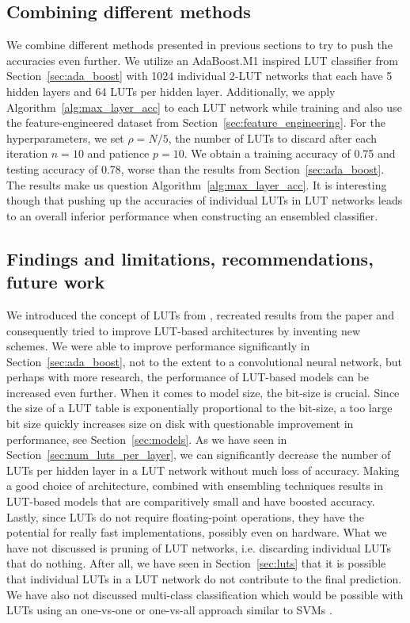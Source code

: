 \subsection{Combining different methods}
We combine different methods presented in previous sections to try to push the accuracies even further. We utilize an AdaBoost.M1 inspired LUT classifier from Section~\ref{sec:ada_boost} with 1024 individual 2-LUT networks that each have 5 hidden layers and 64 LUTs per hidden layer. Additionally, we apply Algorithm~\ref{alg:max_layer_acc} to each LUT network while training and also use the feature-engineered dataset from Section~\ref{sec:feature_engineering}. For the hyperparameters, we set $\rho = N/5$, the number of LUTs to discard after each iteration $n=10$ and patience $p=10$. We obtain a training accuracy of 0.75 and testing accuracy of 0.78, worse than the results from Section~\ref{sec:ada_boost}. The results make us question Algorithm~\ref{alg:max_layer_acc}. It is interesting though that pushing up the accuracies of individual LUTs in LUT networks leads to an overall inferior performance when constructing an ensembled classifier.

\subsection{Findings and limitations, recommendations, future work}
We introduced the concept of LUTs from \cite{bib:chatterjee2018learning}, recreated results from the paper and consequently tried to improve LUT-based architectures by inventing new schemes. We were able to improve performance significantly in Section~\ref{sec:ada_boost}, not to the extent to a convolutional neural network, but perhaps with more research, the performance of LUT-based models can be increased even further. When it comes to model size, the bit-size is crucial. Since the size of a LUT table is exponentially proportional to the bit-size, a too large bit size quickly increases size on disk with questionable improvement in performance, see Section~\ref{sec:models}. As we have seen in Section~\ref{sec:num_luts_per_layer}, we can significantly decrease the number of LUTs per hidden layer in a LUT network without much loss of accuracy. Making a good choice of architecture, combined with ensembling techniques results in LUT-based models that are comparitively small and have boosted accuracy. Lastly, since LUTs do not require floating-point operations, they have the potential for really fast implementations, possibly even on hardware. What we have not discussed is pruning of LUT networks, i.e. discarding individual LUTs that do nothing.  After all, we have seen in Section~\ref{sec:luts} that it is possible that individual LUTs in a LUT network do not contribute to the final prediction. We have also not discussed multi-class classification which would be possible with LUTs using an one-vs-one or one-vs-all approach similar to SVMs \cite{bib:bishop2006pattern}.
